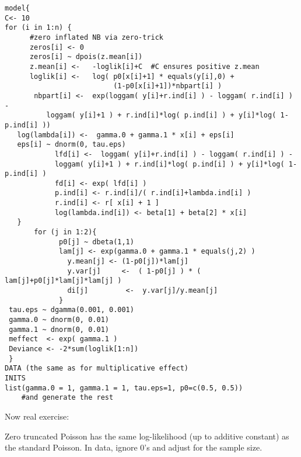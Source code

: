 \documentclass[12pt]{article}
\begin{document}
 \begin{verbatim}
model{
C<- 10
for (i in 1:n) {
      #zero inflated NB via zero-trick
      zeros[i] <- 0
      zeros[i] ~ dpois(z.mean[i])
      z.mean[i] <-   -loglik[i]+C  #C ensures positive z.mean
      loglik[i] <-   log( p0[x[i]+1] * equals(y[i],0) +
                          (1-p0[x[i]+1])*nbpart[i] )
	   nbpart[i] <-  exp(loggam( y[i]+r.ind[i] ) - loggam( r.ind[i] ) - 
          loggam( y[i]+1 ) + r.ind[i]*log( p.ind[i] ) + y[i]*log( 1-p.ind[i] ))
   log(lambda[i]) <-  gamma.0 + gamma.1 * x[i] + eps[i]
   eps[i] ~ dnorm(0, tau.eps)
			lfd[i] <-  loggam( y[i]+r.ind[i] ) - loggam( r.ind[i] ) -
			loggam( y[i]+1 ) + r.ind[i]*log( p.ind[i] ) + y[i]*log( 1-p.ind[i] )
			fd[i] <- exp( lfd[i] )
			p.ind[i] <- r.ind[i]/( r.ind[i]+lambda.ind[i] )
			r.ind[i] <- r[ x[i] + 1 ]   
			log(lambda.ind[i]) <- beta[1] + beta[2] * x[i]
   }
       for (j in 1:2){
             p0[j] ~ dbeta(1,1)
             lam[j] <- exp(gamma.0 + gamma.1 * equals(j,2) )
               y.mean[j] <- (1-p0[j])*lam[j]
               y.var[j]     <-  ( 1-p0[j] ) * ( lam[j]+p0[j]*lam[j]*lam[j] )
               di[j]         <-  y.var[j]/y.mean[j]
             }
 tau.eps ~ dgamma(0.001, 0.001)
 gamma.0 ~ dnorm(0, 0.01)
 gamma.1 ~ dnorm(0, 0.01)
 meffect  <- exp( gamma.1 )
 Deviance <- -2*sum(loglik[1:n])
 }
DATA (the same as for multiplicative effect)
INITS
list(gamma.0 = 1, gamma.1 = 1, tau.eps=1, p0=c(0.5, 0.5))
    #and generate the rest
\end{verbatim}

Now real exercise:

 Zero truncated Poisson has the same 
log-likelihood (up to additive constant) as the 
standard Poisson.  In data, ignore 0's and adjust for the sample size.
\end{document}
